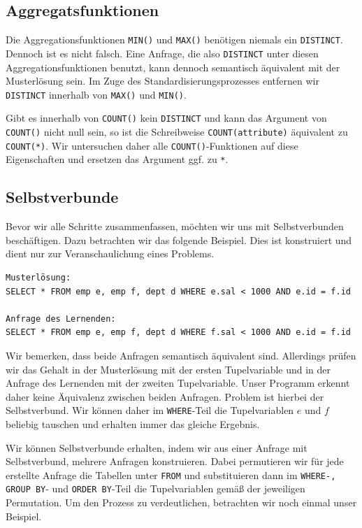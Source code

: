\subsection{Aggregatsfunktionen}

Die Aggregationsfunktionen \verb|MIN()| und \verb|MAX()| benötigen niemals ein \verb|DISTINCT|. Dennoch ist es nicht falsch. Eine Anfrage, die also \verb|DISTINCT| unter diesen Aggregationsfunktionen benutzt, kann dennoch semantisch äquivalent mit der Musterlösung sein. Im Zuge des Standardisierungsprozesses entfernen wir \verb|DISTINCT| innerhalb von \verb|MAX()| und \verb|MIN()|.

Gibt es innerhalb von \verb|COUNT()| kein \verb|DISTINCT| und kann das Argument von \verb|COUNT()| nicht null sein, so ist die Schreibweise \verb|COUNT(attribute)| äquivalent zu \verb|COUNT(*)|. Wir untersuchen daher alle \verb|COUNT()|-Funktionen auf diese Eigenschaften und ersetzen das Argument ggf. zu \verb|*|.

\subsection{Selbstverbunde}

Bevor wir alle Schritte zusammenfassen, möchten wir uns mit Selbstverbunden beschäftigen. Dazu betrachten wir das folgende Beispiel. Dies ist konstruiert und dient nur zur Veranschaulichung eines Problems.

\begin{verbatim}
Musterlösung:
SELECT * FROM emp e, emp f, dept d WHERE e.sal < 1000 AND e.id = f.id

Anfrage des Lernenden:
SELECT * FROM emp e, emp f, dept d WHERE f.sal < 1000 AND e.id = f.id
\end{verbatim}

Wir bemerken, dass beide Anfragen semantisch äquivalent sind. Allerdings prüfen wir das Gehalt in der Musterlösung mit der ersten Tupelvariable und in der Anfrage des Lernenden mit der zweiten Tupelvariable. Unser Programm erkennt daher keine Äquivalenz zwischen beiden Anfragen. Problem ist hierbei der Selbstverbund. Wir können daher im \verb|WHERE|-Teil die Tupelvariablen $e$ und $f$ beliebig tauschen und erhalten immer das gleiche Ergebnis. 

Wir können Selbstverbunde erhalten, indem wir aus einer Anfrage mit Selbstverbund, mehrere Anfragen konstruieren. Dabei permutieren wir für jede erstellte Anfrage die Tabellen unter \verb|FROM| und substituieren dann im \verb|WHERE-, GROUP BY|- und \verb|ORDER BY|-Teil die Tupelvariablen gemäß der jeweiligen Permutation. Um den Prozess zu verdeutlichen, betrachten wir noch einmal unser Beispiel. 

